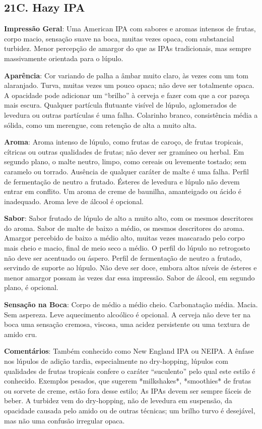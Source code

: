 \subsection*{21C. Hazy IPA}

\textbf{Impressão Geral}: Uma American IPA com sabores e aromas intensos de frutas, corpo macio, sensação suave na boca, muitas vezes opaca, com substancial turbidez. Menor percepção de amargor do que as IPAs tradicionais, mas sempre massivamente orientada para o lúpulo.

\textbf{Aparência}: Cor variando de palha a âmbar muito claro, às vezes com um tom alaranjado. Turva, muitas vezes um pouco opaca; não deve ser totalmente opaca. A opacidade pode adicionar um “brilho” à cerveja e fazer com que a cor pareça mais escura. Qualquer partícula flutuante visível de lúpulo, aglomerados de levedura ou outras partículas é uma falha. Colarinho branco, consistência média a sólida, como um merengue, com retenção de alta a muito alta.

\textbf{Aroma}: Aroma intenso de lúpulo, como frutas de caroço, de frutas tropicais, cítricas ou outras qualidades de frutas; não dever ser gramíneo ou herbal. Em segundo plano, o malte neutro, limpo, como cereais ou levemente tostado; sem caramelo ou torrado. Ausência de qualquer caráter de malte é uma falha. Perfil de fermentação de neutro a frutado. Ésteres de levedura e lúpulo não devem entrar em conflito. Um aroma de creme de baunilha, amanteigado ou ácido é inadequado. Aroma leve de álcool é opcional.

\textbf{Sabor}: Sabor frutado de lúpulo de alto a muito alto, com os mesmos descritores do aroma. Sabor de malte de baixo a médio, os mesmos descritores do aroma. Amargor percebido de baixo a médio alto, muitas vezes mascarado pelo corpo mais cheio e macio, final de meio seco a médio. O perfil do lúpulo no retrogosto não deve ser acentuado ou áspero. Perfil de fermentação de neutro a frutado, servindo de suporte ao lúpulo. Não deve ser doce, embora altos níveis de ésteres e menor amargor possam às vezes dar essa impressão. Sabor de álcool, em segundo plano, é opcional.

\textbf{Sensação na Boca}: Corpo de médio a médio cheio. Carbonatação média. Macia. Sem aspereza. Leve aquecimento alcoólico é opcional. A cerveja não deve ter na boca uma sensação cremosa, viscosa, uma acidez persistente ou uma textura de amido cru.

\textbf{Comentários}: Também conhecido como New England IPA ou NEIPA. A ênfase nos lúpulos de adição tardia, especialmente no dry-hopping, lúpulos com qualidades de frutas tropicais confere o caráter “suculento” pelo qual este estilo é conhecido. Exemplos pesados, que sugerem *milkshakes*, *smoothies* de frutas ou sorvete de creme, estão fora desse estilo; As IPAs devem ser sempre fáceis de beber. A turbidez vem do dry-hopping, não de levedura em suspensão, da opacidade causada pelo amido ou de outras técnicas; um brilho turvo é desejável, mas não uma confusão irregular opaca.

